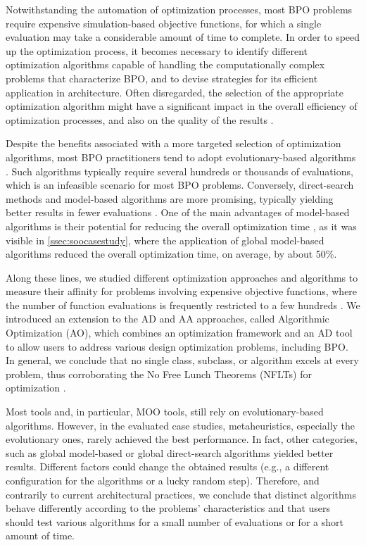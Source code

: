 Notwithstanding the automation of optimization processes, most \ac{BPO} problems require expensive simulation-based objective functions, for which a single evaluation may take a considerable amount of time to complete. In order to speed up the optimization process, it becomes necessary to identify different optimization algorithms capable of handling the computationally complex problems that characterize \ac{BPO}, and to devise strategies for its efficient application in architecture. Often disregarded, the selection of the appropriate optimization algorithm might have a significant impact in the overall efficiency of optimization processes, and also on the quality of the results \cite{Wolpert1997NFLT}. 

Despite the benefits associated with a more targeted selection of optimization algorithms, most \ac{BPO} practitioners tend to adopt evolutionary-based algorithms \cite{Evins2013, Nguyen2014}. Such algorithms typically require several hundreds or thousands of evaluations, which is an infeasible scenario for most \ac{BPO} problems. Conversely, direct-search methods and model-based algorithms are more promising, typically yielding better results in fewer evaluations \cite{Waibel2018}. One of the main advantages of model-based algorithms is their potential for reducing the overall optimization time \cite{Wortmann2017GABESTCHOICE}, as it was visible in \cref{ssec:soocasestudy}, where the application of global model-based algorithms reduced the overall optimization time, on average, by about 50\%. 

Along these lines, we studied different optimization approaches and algorithms to measure their affinity for problems involving expensive objective functions, where the number of function evaluations is frequently restricted to a few hundreds \cite{Caetano2018,Belem2018optimizeddesign,Belem2019MOO,IP2019MOO}. We introduced an extension to the \ac{AD} and \ac{AA} approaches, called Algorithmic Optimization (\ac{AO}), which combines an optimization framework and an \ac{AD} tool to allow users to address various design optimization problems, including \ac{BPO}. In general, we conclude that no single class, subclass, or algorithm excels at every problem, thus corroborating the No Free Lunch Theorems (\acp{NFLT}) for optimization \cite{Wolpert1997NFLT}.  

Most tools and, in particular, \ac{MOO} tools, still rely on evolutionary-based algorithms. However, in the evaluated case studies, metaheuristics, especially the evolutionary ones, rarely achieved the best performance. In fact, other categories, such as global model-based or global direct-search algorithms yielded better results. Different factors could change the obtained results (e.g., a different configuration for the algorithms or a lucky random step). Therefore, and contrarily to current architectural practices, we conclude that distinct algorithms behave differently according to the problems' characteristics and that users should test various algorithms for a small number of evaluations or for a short amount of time. 

